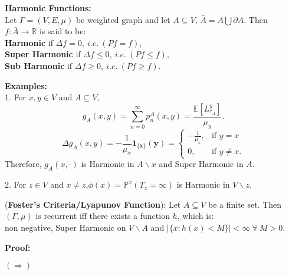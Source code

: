 \documentclass[main]{subfiles}
\begin{document}



\textbf{Harmonic Functions:}\\

Let $\Gamma=(V,E, \mu)$ be weighted graph and let $A\subseteq V$, $\bar{A}=A\bigcup\partial A$. Then $f:\bar{A}\rightarrow \mathbb{R}$ is said to be:\\
\textbf{Harmonic} if $\Delta f=0,~i.e.~ (Pf=f)$,\\
\textbf{Super Harmonic} if $\Delta f\leq 0,~i.e.~ (Pf\leq f)$,\\
\textbf{Sub Harmonic} if $\Delta f\geq 0,~i.e.~ (Pf\geq f)$.

\textbf{Examples:}\\
1. For $x,y\in V$ and $A\subseteq V$,
$$g_A(x,y)=\sum_{n=0}^{\infty}p_n^A(x,y)=\frac{\mathbb{E}[L_{\tau_A}^y]}{\mu_y}.$$
$$\Delta g_A(x,y)=-\frac{1}{\mu_x}\mathbf{1_{\{x\}}(y)}=
    \begin{cases}
        -\frac{1}{\mu_x}, & \text{if $y=x$}      \\
        0,                & \text{if $y\neq x$}.
    \end{cases}$$
Therefore, $g_A(x,\cdot)$ is Harmonic in $A\backslash{x}$ and Super Harmonic in $A$.

2. For $z\in V$ and $x\neq z$,$\phi(x)=\mathbb{P}^x(T_z=\infty)$ is Harmonic in $V\backslash{z}$.

\begin{theorem}
    (\textbf{Foster's Criteria/Lyapunov Function}): Let $A\subseteq V$ be a finite set. Then $(\Gamma,\mu)$ is recurrent iff there exists a function $h$, which is:\\
    non negative,
    Super Harmonic on $V\backslash{A}$ and
    $|\{x:h(x)<M\}|<\infty~\forall~ M>0$.
\end{theorem}

\textbf{Proof:}

$(\Rightarrow)$
\end{document}
